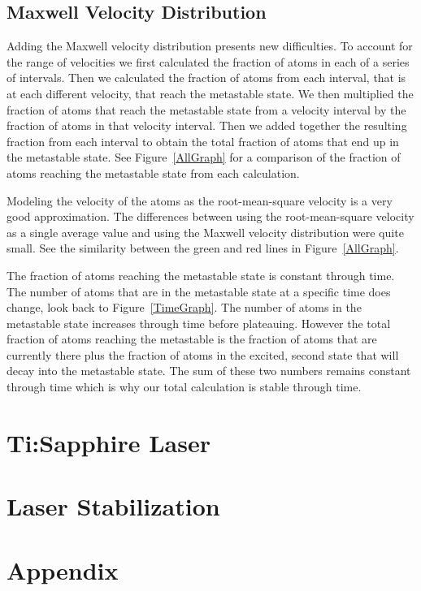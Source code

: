 \documentclass[prb,preprint]{revtex4-1}
\begin{document}
\subsection{Maxwell Velocity Distribution}

Adding the Maxwell velocity distribution presents new difficulties. To account for the range of velocities we first calculated the fraction of atoms in each of a series of intervals. Then we calculated the fraction of atoms from each interval, that is at each different velocity, that reach the metastable state. We then multiplied the fraction of atoms that reach the metastable state from a velocity interval by the fraction of atoms in that velocity interval. Then we added together the resulting fraction from each interval to obtain the total fraction of atoms that end up in the metastable state. See Figure~\ref{AllGraph} for a comparison of the fraction of atoms reaching the metastable state from each calculation.

Modeling the velocity of the atoms as the root-mean-square velocity is a very good approximation. The differences between using the root-mean-square velocity as a single average value and using the Maxwell velocity distribution were quite small. See the similarity between the green and red lines in Figure~\ref{AllGraph}.

The fraction of atoms reaching the metastable state is constant through time. The number of atoms that are in the metastable state at a specific time does change, look back to Figure~\ref{TimeGraph}. The number of atoms in the metastable state increases through time before plateauing. However the total fraction of atoms reaching the metastable is the fraction of atoms that are currently there plus the fraction of atoms in the excited, second state that will decay into the metastable state. The sum of these two numbers remains constant through time which is why our total calculation is stable through time.
 
 
 

\section{Ti:Sapphire Laser}


\section{Laser Stabilization}

\section{Appendix}
\end{document}
